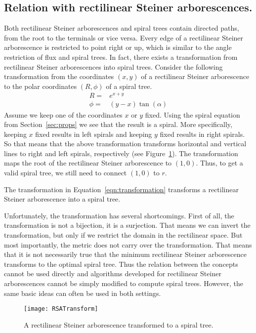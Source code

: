 \documentclass{journalA4}
\begin{document}
\subsection{Relation with rectilinear Steiner arborescences.} \label{sec:transformation}
Both rectilinear Steiner arborescences and spiral trees contain directed paths, from the root to the terminals or vice versa. Every edge of a rectilinear Steiner arborescence is restricted to point right or up, which is similar to the angle restriction of flux and spiral trees. In fact, there exists a transformation from rectilinear Steiner arborescences into spiral trees. Consider the following transformation from the coordinates
$(x, y)$ of a rectilinear Steiner arborescence to the polar coordinates $(R, \phi)$ of a spiral tree.
\begin{align}
\label{eqn:transformation}
R    =& e^{x + y} \\
\nonumber \phi =& (y - x) \tan(\alpha)
\end{align}
Assume we keep one of the coordinates $x$ or $y$ fixed. Using the spiral equation from Section~\ref{sec:props} we see that the result is a spiral. More specifically, keeping $x$ fixed results in left spirals and keeping $y$ fixed results in right spirals. So that means that the above transformation transforms horizontal and vertical lines to right and left spirals, respectively (see Figure~\ref{fig:RSATransform}). The transformation maps the root of the rectilinear Steiner arborescence to $(1, 0)$. Thus, to get a valid spiral tree, we still need to connect $(1, 0)$ to $r$.

\begin{lemma}
The transformation in Equation~\ref{eqn:transformation} transforms a rectilinear Stei\-ner arborescence into a spiral tree.
\end{lemma}
Unfortunately, the transformation has several shortcomings. First of all, the transformation is not a bijection, it is a surjection. That means we can invert the transformation,
but only if we restrict the domain in the rectilinear space. But most importantly, the metric does not carry over the transformation. That means that it is not necessarily true
that the minimum rectilinear Steiner arborescence transforms to the optimal spiral tree. Thus the relation between the concepts cannot be used directly and algorithms developed for rectilinear Steiner arborescences cannot be simply modified to compute spiral trees. However, the same basic ideas can often be used in both settings.

\begin{figure}[t]
  \centering
  \texttt{[image: RSATransform]}
  \caption{A rectilinear Steiner arborescence transformed to a spiral tree.}
  \label{fig:RSATransform}
\end{figure}
\end{document}
